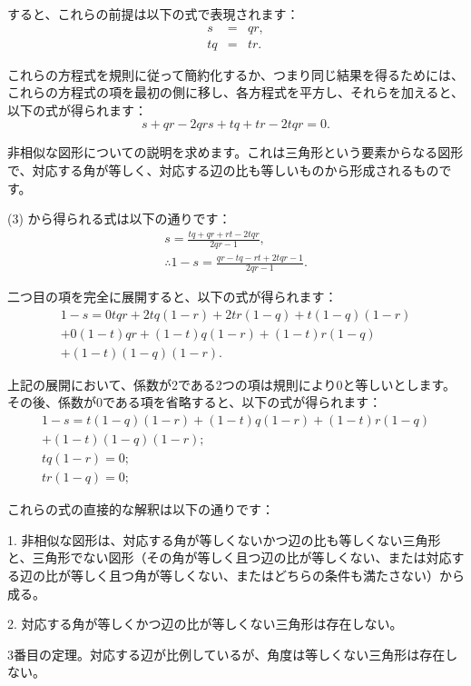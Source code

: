 \documentclass[a4paper,11pt,openany]{ltjsbook}
\begin{document}
すると、これらの前提は以下の式で表現されます：
\setcounter{equation}{0}
\begin{eqnarray}
s & = & qr, \\
tq & = & tr.
\end{eqnarray}

これらの方程式を規則に従って簡約化するか、つまり同じ結果を得るためには、これらの方程式の項を最初の側に移し、各方程式を平方し、それらを加えると、以下の式が得られます：
\begin{equation}
s + qr - 2qrs + tq + tr - 2tqr = 0.
\end{equation}

非相似な図形についての説明を求めます。これは三角形という要素からなる図形で、対応する角が等しく、対応する辺の比も等しいものから形成されるものです。

(3) から得られる式は以下の通りです：
\begin{eqnarray}
s = \frac{tq + qr + rt - 2tqr}{2qr - 1}, \nonumber \\
\therefore 1-s = \frac{qr - tq - rt + 2tqr - 1}{2qr - 1}.
\end{eqnarray}

二つ目の項を完全に展開すると、以下の式が得られます：
\begin{eqnarray}
1 - s = 0tqr + 2tq(1 - r) + 2tr(1 - q) + t(1 - q)(1 - r) \nonumber \\
+ 0(1 - t)qr + (1 - t)q(1 -r) + (1 - t)r(1 - q)\nonumber \\
+ (1 - t)(1 - q)(1 - r).
\end{eqnarray}

上記の展開において、係数が2である2つの項は規則により0と等しいとします。その後、係数が0である項を省略すると、以下の式が得られます：
\begin{eqnarray}
1-s=t(1-q)(1-r)+(1-t)q(1-r)+(1-t)r(1-q)\nonumber\\
+(1-t)(1-q)(1-r); \\
tq(1-r)=0; \\
tr(1-q)=0;
\end{eqnarray}

これらの式の直接的な解釈は以下の通りです：

1. 非相似な図形は、対応する角が等しくないかつ辺の比も等しくない三角形と、三角形でない図形（その角が等しく且つ辺の比が等しくない、または対応する辺の比が等しく且つ角が等しくない、またはどちらの条件も満たさない）から成る。

2. 対応する角が等しくかつ辺の比が等しくない三角形は存在しない。

3番目の定理。対応する辺が比例しているが、角度は等しくない三角形は存在しない。
\end{document}

